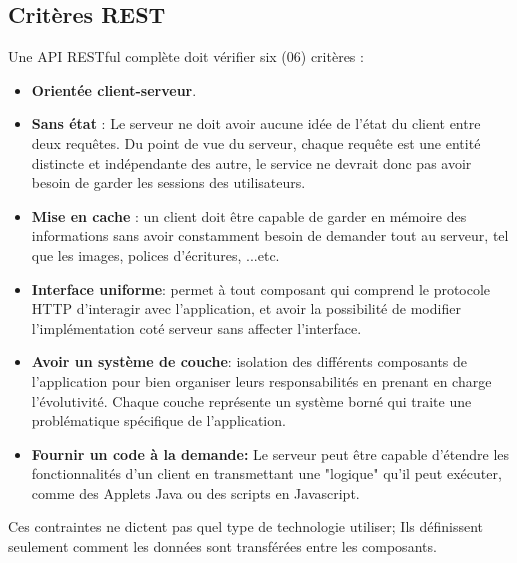 \subsection{Critères REST}
Une API RESTful complète doit vérifier six (06) critères :
\begin{itemize}
	\item \textbf{Orientée client-serveur}.
	      
	\item \textbf{Sans état} : Le serveur ne doit avoir aucune idée de l'état du client entre deux requêtes. Du point de vue du serveur, chaque requête est une entité distincte et indépendante des autre,  le service ne devrait donc pas avoir besoin de garder les sessions des utilisateurs.
	      
	\item \textbf{Mise en cache} : un client doit être capable de garder en mémoire des informations sans avoir constamment besoin de demander tout au serveur, tel que les images, polices d'écritures, ...etc.
	      
	\item \textbf{Interface uniforme}: permet à tout composant qui comprend le protocole HTTP d'interagir avec l'application, et avoir la possibilité de modifier l'implémentation coté serveur sans affecter l'interface.
	      
	\item \textbf{Avoir un système de couche}: isolation des différents composants de l'application pour bien organiser leurs responsabilités en prenant en charge l'évolutivité. Chaque couche représente un système borné qui traite une problématique spécifique de l'application.
	      
	\item \textbf{Fournir un code à la demande: }  Le serveur peut être capable d'étendre les fonctionnalités d'un client en transmettant une "logique" qu'il peut exécuter, comme des Applets Java ou des scripts en Javascript.
	      
\end{itemize}
Ces contraintes ne dictent pas quel type de technologie utiliser; Ils définissent seulement comment les données sont transférées entre les composants.

